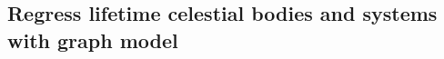 \documentclass{article}
\begin{document}
  \subsection{Regress lifetime celestial bodies and systems with graph model}





    






  
\end{document}

